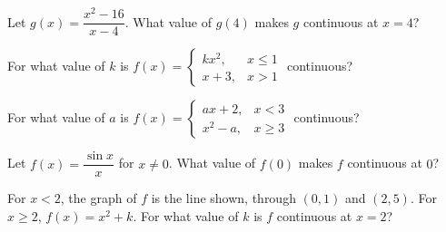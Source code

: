 \begin{exo}{}
Let $g(x)=\dfrac{x^2-16}{x-4}$. What value of $g(4)$ makes $g$ continuous at $x=4$?
\end{exo}
\begin{exo}{}
For what value of $k$ is $f(x)=\begin{cases}kx^2, & x\le1\\ x+3, & x>1\end{cases}$ continuous?
\end{exo}
\begin{exo}{}
For what value of $a$ is $f(x)=\begin{cases}ax+2, & x<3\\ x^2-a, & x\ge3\end{cases}$ continuous?
\end{exo}
\begin{exo}{}
Let $f(x)=\dfrac{\sin x}{x}$ for $x\neq0$. What value of $f(0)$ makes $f$ continuous at $0$?
\end{exo}
\begin{exo}[graph]{}
\begin{minipage}{\linewidth}
For $x<2$, the graph of $f$ is the line shown, through $(0,1)$ and $(2,5)$. For $x\ge2$, $f(x)=x^2+k$. For what value of $k$ is $f$ continuous at $x=2$?
\begin{center}\end{center}
\end{minipage}
\end{exo}
